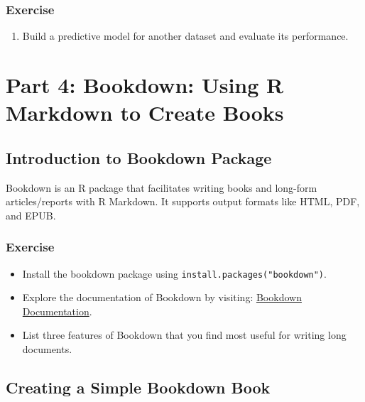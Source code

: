 \documentclass[
]{book}
\providecommand{\tightlist}{%
  \setlength{\itemsep}{0pt}\setlength{\parskip}{0pt}}
\begin{document}
\subsection*{Exercise}\label{exercise-14}

\begin{enumerate}
\def\labelenumi{\arabic{enumi}.}
\setcounter{enumi}{1}
\tightlist
\item
  Build a predictive model for another dataset and evaluate its performance.
\end{enumerate}

\chapter*{Part 4: Bookdown: Using R Markdown to Create Books}\label{part-4-bookdown-using-r-markdown-to-create-books-1}

\section*{Introduction to Bookdown Package}\label{introduction-to-bookdown-package}

Bookdown is an R package that facilitates writing books and long-form articles/reports with R Markdown. It supports output formats like HTML, PDF, and EPUB.

\subsection*{Exercise}\label{exercise-15}

\begin{itemize}
\tightlist
\item
  Install the bookdown package using \texttt{install.packages("bookdown")}.
\item
  Explore the documentation of Bookdown by visiting: \href{https://bookdown.org/}{Bookdown Documentation}.
\item
  List three features of Bookdown that you find most useful for writing long documents.
\end{itemize}

\section*{Creating a Simple Bookdown Book}\label{creating-a-simple-bookdown-book}
\end{document}
